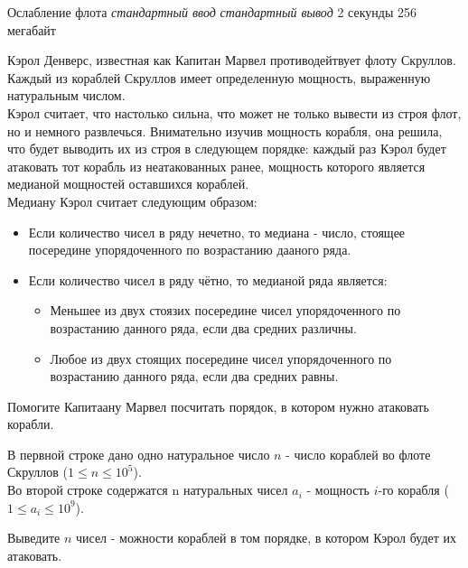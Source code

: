 \begin{problem}%
{Ослабление флота}%
{\textsl{стандартный ввод}}%
{\textsl{стандартный вывод}}%
{2 секунды}%
{256 мегабайт}{}

Кэрол Денверс, известная как Капитан Марвел противодейтвует флоту Скруллов. Каждый из кораблей Скруллов имеет определенную мощность, выраженную натуральным числом.\\

Кэрол считает, что настолько сильна, что может не только вывести из строя флот, но и немного развлечься. Внимательно изучив мощность корабля, она решила, что будет выводить их из строя в следующем порядке: каждый раз Кэрол будет атаковать тот корабль из неатакованных ранее, мощность которого является медианой мощностей оставшихся кораблей.\\

Медиану Кэрол считает следующим образом:

\begin{itemize}
    \item Если количество чисел в ряду нечетно, то медиана - число, стоящее посередине упорядоченного по возрастанию дааного ряда.
    \item Если количество чисел в ряду чётно, то медианой ряда является:
    \begin{itemize}
        \item Меньшее из двух стоязих посередине чисел упорядоченного по возрастанию данного ряда, если два средних различны.
        \item Любое из двух стоящих посередине чисел упорядоченного по возрастанию данного ряда, если два средних равны.
    \end{itemize}
\end{itemize}

Помогите Капитаану Марвел посчитать порядок, в котором нужно атаковать корабли.

\InputFile

В первной строке дано одно натуральное число $n$ - число кораблей во флоте Скруллов ($1 \le n \le 10^5$).\\

Во второй строке содержатся n натуральных чисел $a_i$ - мощность $i$-го корабля ($1 \le a_i \le 10^9$).

\OutputFile

Выведите $n$ чисел - можности кораблей в том порядке, в котором Кэрол будет их атаковать.

\Examples

\begin{example}
%
%
\end{example}
\end{problem}